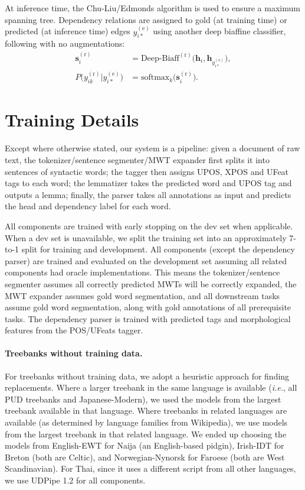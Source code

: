 \documentclass[11pt,a4paper]{article}
\begin{document}
At inference time, the Chu-Liu/Edmonds algorithm \citep{chu1965shortest,edmonds1967optimum} is used to ensure a maximum spanning tree. Dependency relations are assigned to gold (at training time) or predicted (at inference time) edges $y^{(\text{e})}_{i*}$ using another deep biaffine classifier, following \cite{dozat-qi-manning:2017:K17-3} with no augmentations:\begin{align}
  \mathbf{s}_{i}^{(\text{r})} &= \text{Deep-Biaff}^{(\text{r})}\big(\mathbf{h}_i, \mathbf{h}_{y_{i*}^{(\text{e})}}\big) ,\\
  P\big(y_{ik}^{(\text{r})} | y_{i*}^{(\text{e})}\big) &= \text{softmax}_k\big(\mathbf{s}_i^{(\text{r})}\big) .
\end{align} 
\section{Training Details}
Except where otherwise stated, our system is a pipeline: given a document of raw text, the tokenizer/sentence segmenter/MWT expander first splits it into sentences of syntactic words; the tagger then assigns UPOS, XPOS and UFeat tags to each word; the lemmatizer takes the predicted word and UPOS tag and outputs a lemma; finally, the parser takes all annotations as input and predicts the head and dependency label for each word.

All components are trained with early stopping on the dev set when applicable.
When a dev set is unavailable, we split the training set into an approximately 7-to-1 split for training and development.
All components (except the dependency parser) are trained and evaluated on the development set assuming all related components had oracle implementations.
This means the tokenizer/sentence segmenter assumes all correctly predicted MWTs will be correctly expanded, the MWT expander assumes gold word segmentation, and all downstream tasks assume gold word segmentation, along with gold annotations of all prerequisite tasks.
The dependency parser is trained with predicted tags and morphological features from the POS/UFeats tagger.

\paragraph{Treebanks without training data.} For treebanks without training data, we adopt a heuristic approach for finding replacements.
Where a larger treebank in the same language is available (\emph{i.e.}, all PUD treebanks and Japanese-Modern), we used the models from the largest treebank available in that language.
Where treebanks in related languages are available (as determined by language families from Wikipedia), we use models from the largest treebank in that related language.
We ended up choosing the models from English-EWT for Naija (an English-based pidgin), Irish-IDT for Breton (both are Celtic), and Norwegian-Nynorsk for Faroese (both are West Scandinavian).
For Thai, since it uses a different script from all other languages, we use UDPipe 1.2 for all components.
\end{document}
